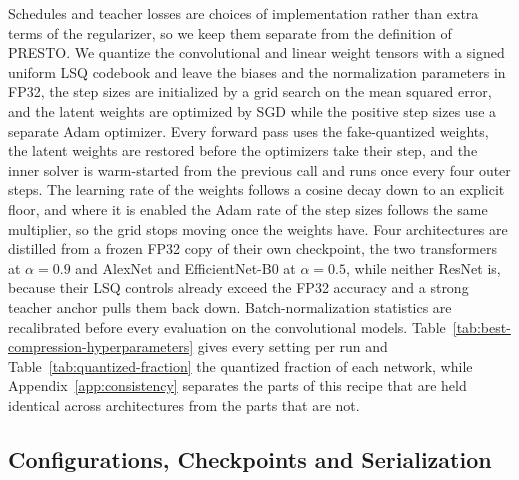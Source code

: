 \documentclass{article}
\begin{document}
Schedules and teacher losses are choices of implementation rather than extra
terms of the regularizer, so we keep them separate from the definition of PRESTO.
We quantize the convolutional and linear weight tensors with a signed uniform LSQ
codebook and leave the biases and the normalization parameters in FP32, the step
sizes are initialized by a grid search on the mean squared error, and the latent
weights are optimized by SGD while the positive step sizes use a separate Adam
optimizer. Every forward pass uses the fake-quantized weights, the latent weights
are restored before the optimizers take their step, and the inner solver is
warm-started from the previous call and runs once every four outer steps. The
learning rate of the weights follows a cosine decay down to an explicit floor,
and where it is enabled the Adam rate of the step sizes follows the same
multiplier, so the grid stops moving once the weights have. Four architectures are
distilled from a frozen FP32 copy of their own checkpoint, the two transformers at
$\alpha=0.9$ and AlexNet and EfficientNet-B0 at $\alpha=0.5$, while neither ResNet
is, because their LSQ controls already exceed the FP32 accuracy and a strong
teacher anchor pulls them back down. Batch-normalization statistics are
recalibrated before every evaluation on the convolutional models.
Table~\ref{tab:best-compression-hyperparameters} gives every setting per run and
Table~\ref{tab:quantized-fraction} the quantized fraction of each network, while
Appendix~\ref{app:consistency} separates the parts of this recipe that are held
identical across architectures from the parts that are not.

\subsection{Configurations, Checkpoints and Serialization}
\label{app:configurations}
\label{app:best-compression-hyperparameters}
\end{document}
